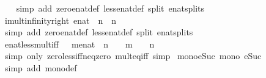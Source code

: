 \begin{isabellebody}
%
\isadelimproof
\ \ %
\endisadelimproof
%
\isatagproof
{}\isamarkupfalse%
\ {\isacharparenleft}simp\ add{\isacharcolon}\ zero{\isacharunderscore}enat{\isacharunderscore}def\ less{\isacharunderscore}enat{\isacharunderscore}def\ split{\isacharcolon}\ enat{\isachardot}splits{\isacharparenright}%
\endisatagproof
{\isafoldproof}%
%
\isadelimproof
\isanewline
%
\endisadelimproof
\isanewline
{}\isamarkupfalse%
\ imult{\isacharunderscore}infinity{\isacharunderscore}right{\isacharcolon}\ {\isachardoublequoteopen}{\isacharparenleft}{}{\isacharcolon}{\isacharcolon}enat{\isacharparenright}\ {\isacharless}\ n\ {\isasymLongrightarrow}\ n\ {\isacharasterisk}\ {\isasyminfinity}\ {\isacharequal}\ {\isasyminfinity}{\isachardoublequoteclose}\isanewline
%
\isadelimproof
\ \ %
\endisadelimproof
%
\isatagproof
{}\isamarkupfalse%
\ {\isacharparenleft}simp\ add{\isacharcolon}\ zero{\isacharunderscore}enat{\isacharunderscore}def\ less{\isacharunderscore}enat{\isacharunderscore}def\ split{\isacharcolon}\ enat{\isachardot}splits{\isacharparenright}%
\endisatagproof
{\isafoldproof}%
%
\isadelimproof
\isanewline
%
\endisadelimproof
\isanewline
{}\isamarkupfalse%
\ enat{\isacharunderscore}{}{\isacharunderscore}less{\isacharunderscore}mult{\isacharunderscore}iff{\isacharcolon}\ {\isachardoublequoteopen}{\isacharparenleft}{}\ {\isacharless}\ {\isacharparenleft}m{\isacharcolon}{\isacharcolon}enat{\isacharparenright}\ {\isacharasterisk}\ n{\isacharparenright}\ {\isacharequal}\ {\isacharparenleft}{}\ {\isacharless}\ m\ {\isasymand}\ {}\ {\isacharless}\ n{\isacharparenright}{\isachardoublequoteclose}\isanewline
%
\isadelimproof
\ \ %
\endisadelimproof
%
\isatagproof
{}\isamarkupfalse%
\ {\isacharparenleft}simp\ only{\isacharcolon}\ zero{\isacharunderscore}less{\isacharunderscore}iff{\isacharunderscore}neq{\isacharunderscore}zero\ mult{\isacharunderscore}eq{\isacharunderscore}{}{\isacharunderscore}iff{\isacharcomma}\ simp{\isacharparenright}%
\endisatagproof
{\isafoldproof}%
%
\isadelimproof
\isanewline
%
\endisadelimproof
\isanewline
{}\isamarkupfalse%
\ mono{\isacharunderscore}eSuc{\isacharcolon}\ {\isachardoublequoteopen}mono\ eSuc{\isachardoublequoteclose}\isanewline
%
\isadelimproof
\ \ %
\endisadelimproof
%
\isatagproof
{}\isamarkupfalse%
\ {\isacharparenleft}simp\ add{\isacharcolon}\ mono{\isacharunderscore}def{\isacharparenright}%
\endisatagproof
{\isafoldproof}%
%
\isadelimproof
\isanewline
%
\endisadelimproof
\isanewline

\end{isabellebody}
